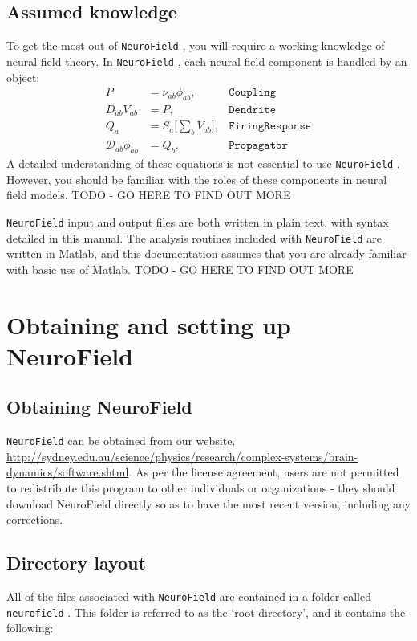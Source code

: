 \documentclass[12pt,a4paper]{article}
\newcommand{\type}[1]{{\small\small\tt #1} }
\newcommand{\NF}[0]{\type{NeuroField}}
\begin{document}
\subsection*{Assumed knowledge}
To get the most out of \NF, you will require a working knowledge of neural field theory. In \NF, each neural field component is handled by an object:
\begin{align*}
    P &= \nu_{ab}\phi_{ab}, & \mathtt{Coupling}\\
    D_{ab}V_{ab} &= P, & \mathtt{Dendrite}\\
    Q_a &= S_a \big[\sum_b V_{ab} \big], & \mathtt{FiringResponse}\\
    \mathcal{D}_{ab}\phi_{ab} &= Q_b.&  \mathtt{Propagator}
\end{align*}
A detailed understanding of these equations is not essential to use \NF. However, you should be familiar with the roles of these components in neural field models. TODO - GO HERE TO FIND OUT MORE

\NF input and output files are both written in plain text, with syntax detailed in this manual. The analysis routines included with \NF are written in Matlab, and this documentation assumes that you are already familiar with basic use of Matlab. TODO - GO HERE TO FIND OUT MORE

\section{Obtaining and setting up NeuroField}
\label{sec:obtain}

\subsection{Obtaining NeuroField}

\NF can be obtained from our website, \url{http://sydney.edu.au/science/physics/research/complex-systems/brain-dynamics/software.shtml}. As per the license agreement, users are not permitted to redistribute this program to other individuals or organizations - they should download NeuroField directly so as to have the most recent version, including any corrections.

\subsection{Directory layout}

All of the files associated with \NF are contained in a folder called \type{neurofield}. This folder is referred to as the `root directory', and it contains the following:
\end{document}
